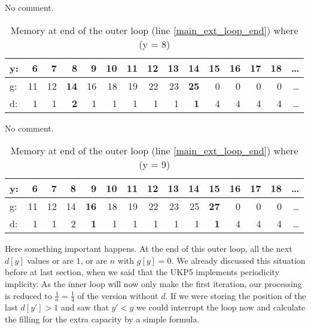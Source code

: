 \documentclass[12pt]{article}
\begin{document}
No comment.

\begin{table}[H]
\centering
\caption{Memory at end of the outer loop (line \ref{main_ext_loop_end}) where (y = 8)}
\label{mem_y_8}
\begin{tabular}{l|rrrrrrrrrrrrrr}
y: & 6 &7 &\textbf{8} &9 &10 &11 &12 &13 &\textbf{14} & 15 &16 &17 &18 &\dots\\
\hline
g: & 11 &12 &\textbf{14} &16 &18 &19 &22 &23 &\textbf{25} &0 &0 &0 &0 &\dots\\
d: & 1 & 1 & \textbf{2} & 1 & 1 & 1 & 1 & 1 & \textbf{1} & 4 & 4 & 4 & 4 & \dots\\
\end{tabular}
\end{table}

No comment.

\begin{table}[H]
\centering
\caption{Memory at end of the outer loop (line \ref{main_ext_loop_end}) where (y = 9)}
\label{mem_y_9}
\begin{tabular}{l|rrrrrrrrrrrrrr}
y: & 6 &7 &8 &\textbf{9} &10 &11 &12 &13 &14 &\textbf{15} &16 &17 &18 &\dots\\
\hline
g: & 11 &12 &14 &\textbf{16} &18 &19 &22 &23 &25 &\textbf{27} &0 &0 &0 &\dots\\
d: & 1 & 1 & 2 & \textbf{1} & 1 & 1 & 1 & 1 & 1 & \textbf{1} & 4 & 4 & 4 & \dots\\
\end{tabular}
\end{table}

Here something important happens. At the end of this outer loop, all the next \(d[y]\) values or are \(1\), or are \(n\) with \(g[y] = 0\). We already discussed this situation before at last section, when we said that the UKP5 implements periodicity implicity. As the inner loop will now only make the first iteration, our processing is reduced to \(\frac{1}{n} = \frac{1}{4}\) of the version without \(d\). If we were storing the position of the last \(d[y'] > 1\) and saw that \(y' < y\) we could interrupt the loop now and calculate the filling for the extra capacity by a simple formula.
\end{document}
